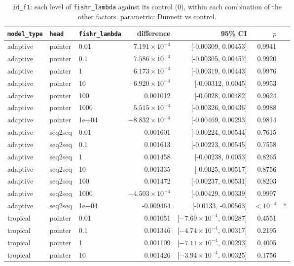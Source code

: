 \documentclass[10pt]{article}
\begin{document}
{\small
\begin{longtable}{lllrrrl}
\caption{\texttt{id\_f1}: each level of \texttt{fishr\_lambda} against its control (0), within each combination of the other factors. parametric: Dunnett vs control.}\label{tab:control-id_f1}\\
\toprule
\texttt{model\_type} & \texttt{head} & \texttt{fishr\_lambda} & difference & 95\% CI & $p$ & \\
\midrule
\endhead
adaptive & pointer & 0.01 & $7.191\times10^{-4}$ & [-0.00309, 0.00453] & 0.9941 & \\
adaptive & pointer & 0.1 & $7.586\times10^{-4}$ & [-0.00305, 0.00457] & 0.9920 & \\
adaptive & pointer & 1 & $6.173\times10^{-4}$ & [-0.00319, 0.00443] & 0.9976 & \\
adaptive & pointer & 10 & $6.920\times10^{-4}$ & [-0.00312, 0.0045] & 0.9953 & \\
adaptive & pointer & 100 & 0.001012 & [-0.0028, 0.00482] & 0.9624 & \\
adaptive & pointer & 1000 & $5.515\times10^{-4}$ & [-0.00326, 0.00436] & 0.9988 & \\
adaptive & pointer & 1e+04 & $-8.832\times10^{-4}$ & [-0.00469, 0.00293] & 0.9814 & \\
adaptive & seq2seq & 0.01 & 0.001601 & [-0.00224, 0.00544] & 0.7615 & \\
adaptive & seq2seq & 0.1 & 0.001613 & [-0.00223, 0.00545] & 0.7558 & \\
adaptive & seq2seq & 1 & 0.001458 & [-0.00238, 0.0053] & 0.8265 & \\
adaptive & seq2seq & 10 & 0.001335 & [-0.0025, 0.00517] & 0.8756 & \\
adaptive & seq2seq & 100 & 0.001472 & [-0.00237, 0.00531] & 0.8203 & \\
adaptive & seq2seq & 1000 & $-4.503\times10^{-4}$ & [-0.00429, 0.00339] & 0.9997 & \\
adaptive & seq2seq & 1e+04 & -0.009464 & [-0.0133, -0.00563] & $<10^{-4}$ & *\\
tropical & pointer & 0.01 & 0.001051 & [$-7.69\times10^{-4}$, 0.00287] & 0.4551 & \\
tropical & pointer & 0.1 & 0.001346 & [$-4.74\times10^{-4}$, 0.00317] & 0.2195 & \\
tropical & pointer & 1 & 0.001109 & [$-7.11\times10^{-4}$, 0.00293] & 0.4005 & \\
tropical & pointer & 10 & 0.001426 & [$-3.94\times10^{-4}$, 0.00325] & 0.1756 & \\

\end{longtable}}
\end{document}
